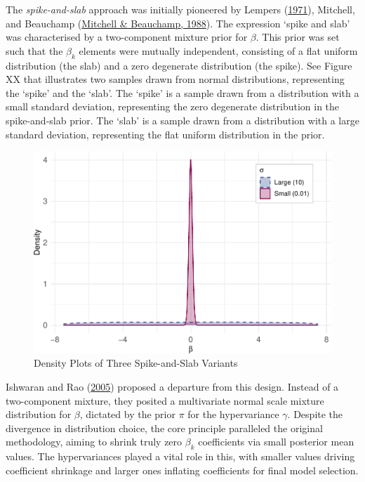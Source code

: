 \documentclass[
  11pt,
]{article}
\begin{document}
The \emph{spike-and-slab} approach was initially pioneered by Lempers
(\protect\hyperlink{ref-Lempers1971}{1971}), Mitchell, and Beauchamp
(\protect\hyperlink{ref-Mitchell1988}{Mitchell \& Beauchamp, 1988}). The
expression `spike and slab' was characterised by a two-component mixture
prior for \(\beta\). This prior was set such that the \(\beta_k\)
elements were mutually independent, consisting of a flat uniform
distribution (the slab) and a zero degenerate distribution (the spike).
See Figure XX that illustrates two samples drawn from normal
distributions, representing the `spike' and the `slab'. The `spike' is a
sample drawn from a distribution with a small standard deviation,
representing the zero degenerate distribution in the spike-and-slab
prior. The `slab' is a sample drawn from a distribution with a large
standard deviation, representing the flat uniform distribution in the
prior.

\begin{figure}

{\centering \includegraphics[width=0.75\linewidth]{dissertation_files/figure-latex/Spike Slab Priors-1} 

}

\caption{Density Plots of Three Spike-and-Slab Variants}\label{fig:Spike Slab Priors}
\end{figure}

Ishwaran and Rao (\protect\hyperlink{ref-Ishwaran2005}{2005}) proposed a
departure from this design. Instead of a two-component mixture, they
posited a multivariate normal scale mixture distribution for \(\beta\),
dictated by the prior \(\pi\) for the hypervariance \(\gamma\). Despite
the divergence in distribution choice, the core principle paralleled the
original methodology, aiming to shrink truly zero \(\beta_k\)
coefficients via small posterior mean values. The hypervariances played
a vital role in this, with smaller values driving coefficient shrinkage
and larger ones inflating coefficients for final model selection.
\end{document}
